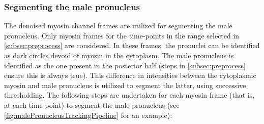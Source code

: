 \subsubsection{Segmenting the male pronucleus}\label{subsubsec:nucleusDetect}
The denoised myosin channel frames are utilized for segmenting the male pronucleus. Only myosin frames for the time-points in the range selected in \autoref{subsec:preprocess} are considered. In these frames, the pronuclei can be identified as dark circles devoid of myosin in the cytoplasm. The male pronucleus is identified as the one present in the posterior half (steps in \autoref{subsec:preprocess} ensure this is always true). This difference in intensities between the cytoplasmic myosin and male pronucleus is utilized to segment the latter, using successive thresholding. The following steps are undertaken for each myosin frame (that is, at each time-point) to segment the male pronucleus (see \autoref{fig:malePronucleusTrackingPipeline} for an example):
